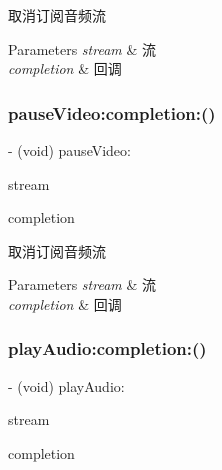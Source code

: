 取消订阅音频流 
\begin{DoxyParams}{Parameters}
{\em stream} & 流 \\
\hline
{\em completion} & 回调 \\
\hline
\end{DoxyParams}
\mbox{\label{interface_c_c_streamer_basic_a52ea0a4735f76f199f6d314e2cc159ad}} 
\subsubsection{\texorpdfstring{pause\+Video\+:completion\+:()}{pauseVideo:completion:()}}
{\footnotesize\ttfamily -\/ (void) pause\+Video\+: \begin{DoxyParamCaption}\item[{(\hyperlink{interface_c_c_stream}{C\+C\+Stream} $\ast$)}]{stream }\item[{completion:(C\+C\+Comletion\+Block)}]{completion }\end{DoxyParamCaption}}

取消订阅音频流 
\begin{DoxyParams}{Parameters}
{\em stream} & 流 \\
\hline
{\em completion} & 回调 \\
\hline
\end{DoxyParams}
\mbox{\label{interface_c_c_streamer_basic_a6ed3877a3e3d2a4a9cb3be32b566b261}} 
\subsubsection{\texorpdfstring{play\+Audio\+:completion\+:()}{playAudio:completion:()}}
{\footnotesize\ttfamily -\/ (void) play\+Audio\+: \begin{DoxyParamCaption}\item[{(\hyperlink{interface_c_c_stream}{C\+C\+Stream} $\ast$)}]{stream }\item[{completion:(C\+C\+Comletion\+Block)}]{completion }\end{DoxyParamCaption}}


